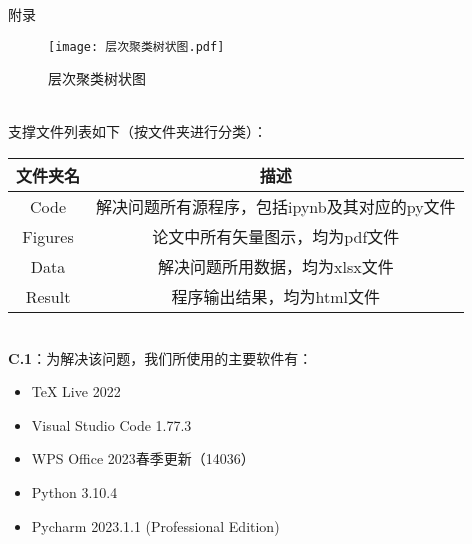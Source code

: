 \documentclass{MathModeling}
\begin{document}

	\begin{center}
		\heiti{} 附\hspace{2pc}录
	\end{center}

	\begin{figure}[H]
		\centering
		\texttt{[image: 层次聚类树状图.pdf]}
		\caption{层次聚类树状图}
		\label{fig:层次聚类树状图}
	\end{figure}
	~\\

	支撑文件列表如下（按文件夹进行分类）：

\begin{table}[H]   
	\centering     
	\begin{tabular}{cc}     
		\toprule     
		\textbf{文件夹名} & \textbf{描述} \\     
		\midrule     
		Code  & 解决问题所有源程序，包括ipynb及其对应的py文件 \\     Figures & 论文中所有矢量图示，均为pdf文件 \\     
		Data  & 解决问题所用数据，均为xlsx文件 \\     
		Result & 程序输出结果，均为html文件 \\     
		\bottomrule     
	\end{tabular}
\end{table}

\newpage
	~\\

	\textbf{C.1}：为解决该问题，我们所使用的主要软件有：
	\begin{itemize}
		\item TeX Live 2022
		\item Visual Studio Code 1.77.3
		\item WPS Office 2023春季更新（14036）
		\item Python 3.10.4
		\item Pycharm 2023.1.1 (Professional Edition)
	\end{itemize}
\end{document}
